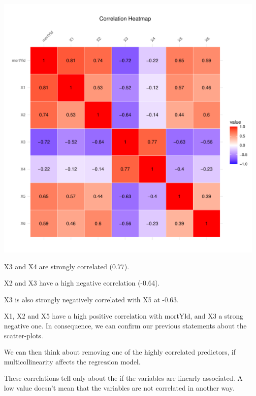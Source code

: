 \documentclass[
  11pt,
]{article}
\newenvironment{Shaded}{\begin{snugshade}}{\end{snugshade}}
\newcommand{\FunctionTok}[1]{\textcolor[rgb]{0.13,0.29,0.53}{\textbf{#1}}}
\newcommand{\NormalTok}[1]{#1}
\newcommand{\SpecialCharTok}[1]{\textcolor[rgb]{0.81,0.36,0.00}{\textbf{#1}}}
\begin{document}
\includegraphics{Figs/unnamed-chunk-7-1.pdf}

X3 and X4 are strongly correlated (0.77).

X2 and X3 have a high negative correlation (-0.64).

X3 is also strongly negatively correlated with X5 at -0.63.

X1, X2 and X5 have a high positive correlation with mortYld, and X3 a
strong negative one. In consequence, we can confirm our previous
statements about the scatter-plots.

We can then think about removing one of the highly correlated
predictors, if multicollinearity affects the regression model.

These correlations tell only about the if the variables are linearly
associated. A low value doesn't mean that the variables are not
correlated in another way.

\begin{Shaded}
\end{Shaded}
\end{document}
